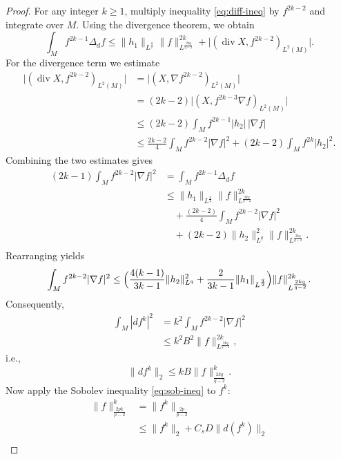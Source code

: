 \documentclass[10pt,a4paper]{amsart}
\def \De {\Delta}
\def\na {\nabla}
\begin{document}
	\begin{proof}
		For any integer \(k \ge 1\), multiply inequality \eqref{eq:diff-ineq} by \(f^{2k-2}\) and integrate over \(M\). Using the divergence theorem, we obtain
		\[
		\int_M f^{2k-1}\Delta_d f \le 
		\|h_1\|_{L^\frac{q}{2} } \|f\|_{L^{\frac{2kq}{q-2}}}^{2k}
		+ \bigl|(\operatorname{div} X, f^{2k-2})_{L^2(M)}\bigr|.
		\]
		For the divergence term we estimate
		\begin{align*}
		\bigl|(\operatorname{div} X, f^{2k-2})_{L^2(M)}\bigr|
		&= \bigl|(X, \nabla f^{2k-2})_{L^2(M)}\bigr| \\
		&= (2k-2)\bigl|(X, f^{2k-3}\nabla f)_{L^2(M)}\bigr| \\
		&\le (2k-2)\int_M f^{2k-1}|h_2|\,|\nabla f| \\
		&\le \frac{2k-2}{4}\int_M f^{2k-2}|\nabla f|^2 
		+ (2k-2)\int_M f^{2k}|h_2|^2 .
		\end{align*}
		Combining the two estimates gives
		\begin{align*}
		(2k-1)\int_{M}f^{2k-2}|\na f|^{2}&=\int_{M}f^{2k-1}\De_{d}f\\
		&\leq  \|h_{1}\|_{L^{\frac{q}{2}}}\|f\|^{2k}_{L^{\frac{2kq}{q-2}}}\\
		&\quad+\frac{(2k-2)}{4}\int_{M}f^{2k-2}|\na f|^{2}\\
		&\quad+(2k-2)\|h_{2}\|^{2}_{L^{q}}\|f\|^{2k}_{L^{\frac{2kq}{q-2}}}.\\
		\end{align*}
		Rearranging yields
		\begin{equation}\label{V6}
		\int_M f^{2k-2}|\nabla f|^2 \le 
		\Bigl(\frac{4(k-1)}{3k-1}\|h_2\|_{L^{q}}^2 +\frac{2}{3k-1} \|h_1\|_{L^\frac{q}{2}}\Bigr)
		\|f\|_{L^{\frac{2kq}{q-2}}}^{2k}.
		\end{equation}   
		Consequently,
		\begin{align*}
		\int_M |d f^k|^2 &= k^2\int_M f^{2k-2}|\nabla f|^2 \\
		&\le k^2 B^2 \|f\|_{L^{\frac{2kq}{q-2}}}^{2k},
		\end{align*}
		i.e.,
		\begin{equation}\label{eq:gradient-bound}
		\|d f^k\|_2 \le k B \|f\|_{\frac{2kq}{q-2}}^k .
		\end{equation}
		{
		Now apply the Sobolev inequality \eqref{eq:sob-ineq} to \(f^k\):
		\begin{align*}
		\|f\|_{\frac{2pk}{p-2}}^k 
		&= \|f^k\|_{\frac{2p}{p-2}} \\
		&\le \|f^k\|_2 + C_s D \|d(f^k)\|_2 \\

\end{align*}}
\end{proof}
\end{document}
